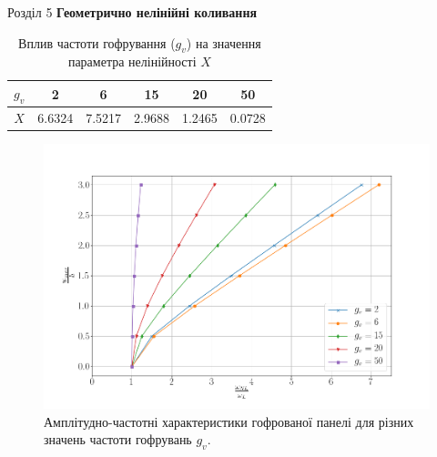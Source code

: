 \documentclass[8pt]{beamer}
\numberwithin{figure}{section}
\numberwithin{equation}{section}
\numberwithin{table}{section}
\begin{document}
\begin{frame}{Розділ 5}
\textbf{Геометрично нелінійні коливання}

\begin{table}[h!]
\caption{Вплив частоти гофрування ($g_v$) на значення параметра нелінійності $X$}
\centering
 \begin{tabular}{| c | c | c | c | c | c |} 
 \hline
 $g_v$ & 2 & 6 & 15 & 20 & 50 \\ 
  \hline
 $X$ & 6.6324 & 7.5217 & 2.9688 & 1.2465 & 0.0728 \\
   \hline
\end{tabular}
\end{table}

\begin{figure}
	\includegraphics[scale=0.23]{pic/corrugated_nonlinear.png}
		\caption{Амплітудно-частотні характеристики гофрованої панелі для різних значень частоти гофрувань $g_v$.}
\end{figure}

\end{frame}
\end{document}
